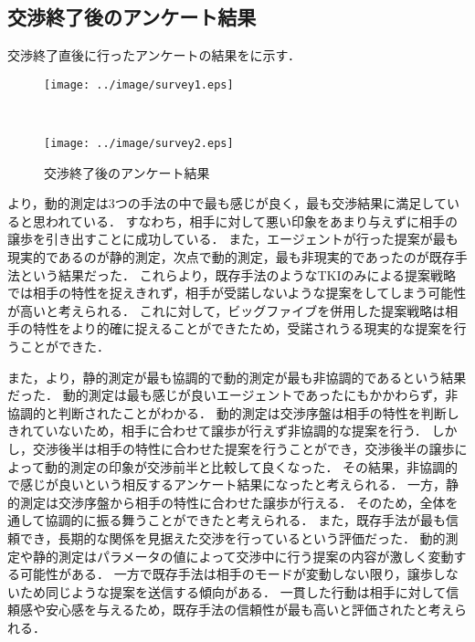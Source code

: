 \subsection{交渉終了後のアンケート結果}
交渉終了直後に行ったアンケートの結果をに示す．
\begin{figure}[!bt]
    \begin{minipage}[b]{0.95\linewidth}
        \centering
        \texttt{[image: ../image/survey1.eps]}
        \label{fig:survey1}
    \end{minipage}\\
    \begin{center}
        \begin{minipage}[b]{0.95\linewidth}
            \centering
            \texttt{[image: ../image/survey2.eps]}
            \label{fig:survey2}
        \end{minipage}
    \end{center}
    \caption{交渉終了後のアンケート結果}\label{fig:survey}
\end{figure}
より，動的測定は3つの手法の中で最も感じが良く，最も交渉結果に満足していると思われている．
すなわち，相手に対して悪い印象をあまり与えずに相手の譲歩を引き出すことに成功している．
また，エージェントが行った提案が最も現実的であるのが静的測定，次点で動的測定，最も非現実的であったのが既存手法という結果だった．
これらより，既存手法のようなTKIのみによる提案戦略では相手の特性を捉えきれず，相手が受諾しないような提案をしてしまう可能性が高いと考えられる．
これに対して，ビッグファイブを併用した提案戦略は相手の特性をより的確に捉えることができたため，受諾されうる現実的な提案を行うことができた．

また，より，静的測定が最も協調的で動的測定が最も非協調的であるという結果だった．
動的測定は最も感じが良いエージェントであったにもかかわらず，非協調的と判断されたことがわかる．
動的測定は交渉序盤は相手の特性を判断しきれていないため，相手に合わせて譲歩が行えず非協調的な提案を行う．
しかし，交渉後半は相手の特性に合わせた提案を行うことができ，交渉後半の譲歩によって動的測定の印象が交渉前半と比較して良くなった．
その結果，非協調的で感じが良いという相反するアンケート結果になったと考えられる．
一方，静的測定は交渉序盤から相手の特性に合わせた譲歩が行える．
そのため，全体を通して協調的に振る舞うことができたと考えられる．
また，既存手法が最も信頼でき，長期的な関係を見据えた交渉を行っているという評価だった．
動的測定や静的測定はパラメータの値によって交渉中に行う提案の内容が激しく変動する可能性がある．
一方で既存手法は相手のモードが変動しない限り，譲歩しないため同じような提案を送信する傾向がある．
一貫した行動は相手に対して信頼感や安心感を与えるため，既存手法の信頼性が最も高いと評価されたと考えられる．

